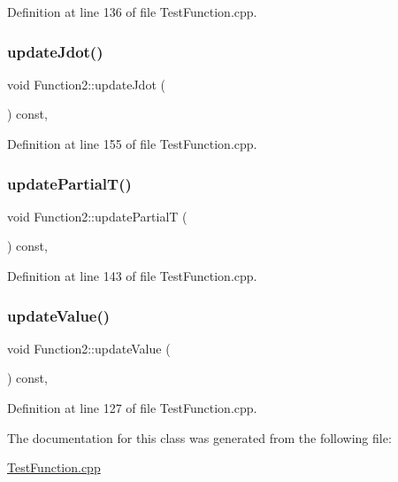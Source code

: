 Definition at line 136 of file Test\+Function.\+cpp.

\hypertarget{classFunction2_a134ead37ced770c93bbce1ef656564bb}{}\label{classFunction2_a134ead37ced770c93bbce1ef656564bb} 
\subsubsection{\texorpdfstring{update\+Jdot()}{updateJdot()}}
{\footnotesize\ttfamily void Function2\+::update\+Jdot (\begin{DoxyParamCaption}{ }\end{DoxyParamCaption}) const\hspace{0.3cm}{\ttfamily [inline]}, {\ttfamily [protected]}}



Definition at line 155 of file Test\+Function.\+cpp.

\hypertarget{classFunction2_ac5152db91aedd2eddb4b69e6bd446659}{}\label{classFunction2_ac5152db91aedd2eddb4b69e6bd446659} 
\subsubsection{\texorpdfstring{update\+Partial\+T()}{updatePartialT()}}
{\footnotesize\ttfamily void Function2\+::update\+PartialT (\begin{DoxyParamCaption}{ }\end{DoxyParamCaption}) const\hspace{0.3cm}{\ttfamily [inline]}, {\ttfamily [protected]}}



Definition at line 143 of file Test\+Function.\+cpp.

\hypertarget{classFunction2_ae491a20ff42d37d6512bc5b45b1a2566}{}\label{classFunction2_ae491a20ff42d37d6512bc5b45b1a2566} 
\subsubsection{\texorpdfstring{update\+Value()}{updateValue()}}
{\footnotesize\ttfamily void Function2\+::update\+Value (\begin{DoxyParamCaption}{ }\end{DoxyParamCaption}) const\hspace{0.3cm}{\ttfamily [inline]}, {\ttfamily [protected]}}



Definition at line 127 of file Test\+Function.\+cpp.



The documentation for this class was generated from the following file\+:\begin{DoxyCompactItemize}
\item 
\hyperlink{TestFunction_8cpp}{Test\+Function.\+cpp}\end{DoxyCompactItemize}
